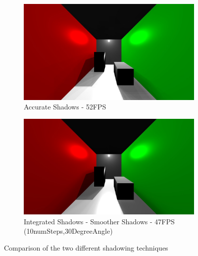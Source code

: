 \begin{figure}
        \centering
        \begin{subfigure}[b]{1.0\textwidth}
                \includegraphics[width=\textwidth]{AltResults/oldmethod.jpg}
                \caption{Accurate Shadows - 52FPS}
        \end{subfigure}
        \centering
        \begin{subfigure}[b]{1.0\textwidth}
                \includegraphics[width=\textwidth]{AltResults/10numSteps30Angle.jpg}
                \caption{Integrated Shadows - Smoother Shadows - 47FPS (10numSteps,30DegreeAngle)}
        \end{subfigure}
        \caption{Comparison of the two different shadowing techniques}
\end{figure}

